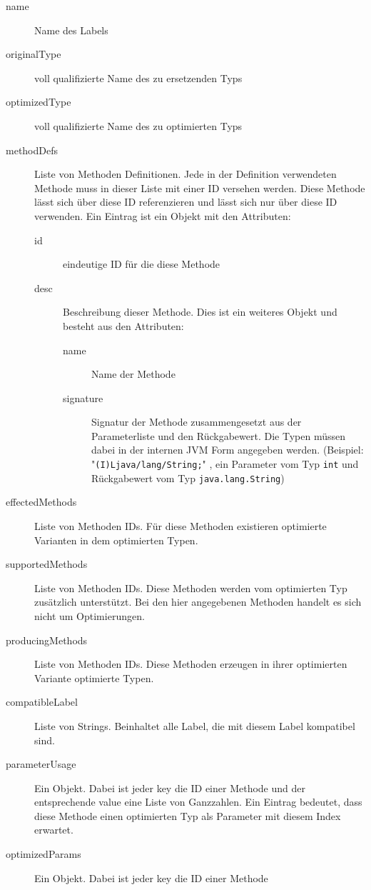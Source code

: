 \begin{description}
	\item[name] Name des Labels
	\item[originalType] voll qualifizierte Name des zu ersetzenden Typs
	\item[optimizedType] voll qualifizierte Name des zu optimierten Typs
	\item[methodDefs] Liste von Methoden Definitionen. Jede in der Definition verwendeten Methode muss
	in dieser Liste mit einer ID versehen werden. Diese Methode lässt sich über diese
	ID referenzieren und lässt sich nur über diese ID verwenden. Ein Eintrag ist ein Objekt mit
	den Attributen:
	\begin{description}
		\item[id] eindeutige ID für die diese Methode
		\item[desc] Beschreibung dieser Methode. Dies ist ein weiteres Objekt 
		und besteht aus den Attributen:
		\begin{description}
			\item[name] Name der Methode
			\item[signature] Signatur der Methode zusammengesetzt aus der
			Parameterliste und den Rückgabewert. Die Typen müssen dabei in der 
			internen JVM Form angegeben werden. (Beispiel: "\texttt{(I)Ljava/lang/String;}"
			, ein Parameter vom Typ \texttt{int} und Rückgabewert vom Typ
			\texttt{java.lang.String})
		\end{description}	
	\end{description}
	\item[effectedMethods] Liste von Methoden IDs. Für diese Methoden existieren 
	optimierte Varianten in dem optimierten Typen.
	\item[supportedMethods] Liste von Methoden IDs. Diese Methoden werden vom
	optimierten Typ zusätzlich unterstützt. Bei den hier angegebenen Methoden handelt 
	es sich nicht um Optimierungen.
	\item[producingMethods] Liste von Methoden IDs. Diese Methoden erzeugen 
	in ihrer optimierten Variante optimierte Typen.
	\item[compatibleLabel] Liste von Strings. Beinhaltet alle Label, die mit diesem Label
	kompatibel sind.
	\item[parameterUsage] Ein Objekt. Dabei ist jeder key die ID einer Methode 
	und der entsprechende value eine Liste von Ganzzahlen. Ein Eintrag bedeutet, 
	dass diese Methode einen optimierten Typ als Parameter mit diesem Index 
	erwartet. 
	\item[optimizedParams] Ein Objekt. Dabei ist jeder key die ID einer Methode 

\end{description}
